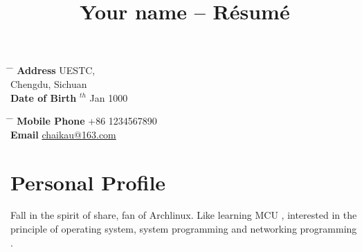 \documentclass[10pt]{article} %
\begin{document}

\title{{\song Your name} -- Résumé} %


\parbox{0.5\textwidth}{ %
\begin{tabbing} %
\hspace{3cm} \= \hspace{4cm} \= \kill %
{\bf Address} \> UESTC, \\ %
\> Chengdu, Sichuan \\ %
{\bf Date of Birth} $^{th}$ Jan 1000\\ %
\end{tabbing}}
\hfill %
\parbox{0.5\textwidth}{ %
\begin{tabbing} %
\hspace{3cm} \= \hspace{4cm} \= \kill %
{\bf Mobile Phone} \> +86 1234567890\\ %
{\bf Email} \> \href{mailto:chaikau@163.com}{chaikau@163.com} \\ %
\end{tabbing}}


\section{Personal Profile}
Fall in the spirit of share, fan of Archlinux. Like learning MCU , interested in the principle of operating system, system programming and networking programming . 
\end{document}
